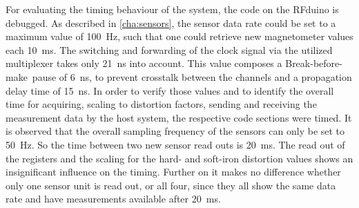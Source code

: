 \begin{figure}
\hfill
{}
\caption{}
\label{fig:clipping}
\end{figure}

For evaluating the timing behaviour of the system, the code on the RFduino is debugged. As described in \ref{cha:sensors}, the sensor data rate could be set to a maximum value of \SI{100}{\Hz}, such that one could retrieve new magnetometer values each \SI{10}{\milli \second}. The switching and forwarding of the clock signal via the utilized multiplexer takes only \SI{21}{\nano \second} into account. This value composes a \grqq Break-before-make\grqq \, pause of \SI{6}{\nano \second}, to prevent crosstalk between the channels and a propagation delay time of \SI{15}{\nano \second}. In order to verify those values and to identify the overall time for acquiring, scaling to distortion factors, sending and receiving the measurement data by the host system, the respective code sections were timed. It is observed that the overall sampling frequency of the sensors can only be set to \SI{50}{\Hz}. So the time between two new sensor read outs is \SI{20}{\milli \second}. The read out of the registers and the scaling for the hard- and soft-iron distortion values shows an insignificant influence on the timing. Further on it makes no difference whether only one sensor unit is read out, or all four, since they all show the same data rate and have measurements available after \SI{20}{\milli \second}. 
